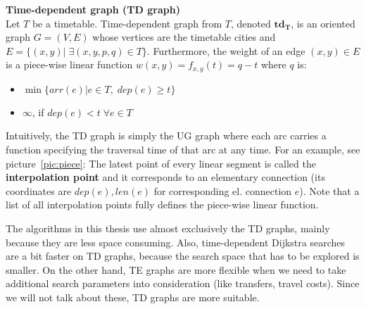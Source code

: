     \begin{definition}
		\textbf{Time-dependent graph (TD graph)}\\
        Let $T$ be a timetable. Time-dependent graph from $T$, denoted $\bm{td_{T}}$, is an oriented graph $G = (V, E)$ whose vertices are the timetable cities and $E = \{(x, y)| \; \exists (x, y, p, q) \in T\}$. Furthermore, the weight of an edge $(x, y) \in E$ is a piece-wise linear function $w(x, y) = f_{x, y}(t) = q - t$ where $q$ is:
        \begin{itemize}
        	\item $\min \{arr(e) | e \in T, \; dep(e) \geq t\}$
        	\item $\infty$, if $dep(e) < t \; \forall e \in T$
        \end{itemize}
	\end{definition}
	
	\noindent Intuitively, the TD graph is simply the UG graph where each arc carries a function specifying the traversal time of that arc at any time. For an example, see picture~\ref{pic:piece}: The latest point of every linear segment is called the \textbf{interpolation point} and it corresponds to an elementary connection (its coordinates are $dep(e), len(e)$ for corresponding el. connection $e$). Note that a list of all interpolation points fully defines the piece-wise linear function.
	
	The algorithms in this thesis use almost exclusively the TD graphs, mainly because they are less space consuming. Also, time-dependent Dijkstra searches are a bit faster on TD graphs, because the search space that has to be explored is smaller. On the other hand, TE graphs are more flexible when we need to take additional search parameters into consideration (like transfers, travel costs). Since we will not talk about these, TD graphs are more suitable. 
	
	\begin{figure}[htb]
	\centering
	\end{figure}
	
